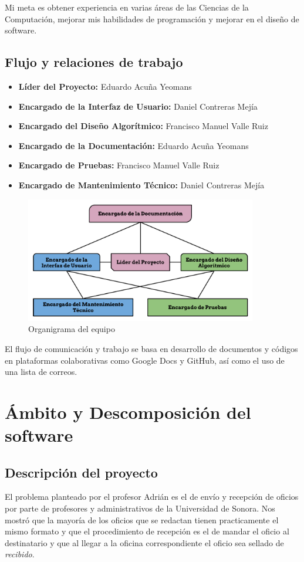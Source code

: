 \documentclass[letterpaper]{article}
\begin{document}
Mi meta es obtener experiencia en varias áreas de las Ciencias de la Computación, mejorar mis habilidades de programación y mejorar en el diseño de software.

\subsection{Flujo y relaciones de trabajo}

\begin{itemize}
\item \textbf{Líder del Proyecto:} Eduardo Acuña Yeomans
\item \textbf{Encargado de la Interfaz de Usuario:} Daniel Contreras Mejía
\item \textbf{Encargado del Diseño Algorítmico:} Francisco Manuel Valle Ruiz
\item \textbf{Encargado de la Documentación:} Eduardo Acuña Yeomans
\item \textbf{Encargado de Pruebas:} Francisco Manuel Valle Ruiz
\item \textbf{Encargado de Mantenimiento Técnico:} Daniel Contreras Mejía 
\end{itemize}

\begin{figure}[h!]
  \centering
    \includegraphics[width=0.9\textwidth]{Organigrama}
    \caption{Organigrama del equipo}
\end{figure}

El flujo de comunicación y trabajo se basa en desarrollo de documentos y códigos en plataformas colaborativas como Google Docs y GitHub, así como el uso de una lista de correos.

\section{Ámbito y Descomposición del software}
\subsection{Descripción del proyecto}
El problema planteado por el profesor Adrián es el de envío y recepción de oficios por parte de profesores y administrativos de la Universidad de Sonora. Nos mostró que la mayoría de los oficios que se redactan tienen practicamente el mismo formato y que el procedimiento de recepción es el de mandar el oficio al destinatario y que al llegar a la oficina correspondiente el oficio sea sellado de \emph{recibido}.
\end{document}
